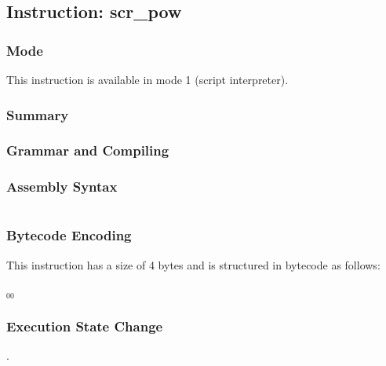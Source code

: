\subsection{Instruction: scr\_pow}

\subsubsection{Mode}
This instruction is available in mode 1 (script interpreter).
\subsubsection{Summary}


\subsubsection{Grammar and Compiling}


\subsubsection{Assembly Syntax}

\begin{myquote}
\begin{verbatim}

\end{verbatim}
\end{myquote}

\subsubsection{Bytecode Encoding}

This instruction has a size of 4 bytes and is structured in bytecode as follows:

$_{00}$\ 


\subsubsection{Execution State Change}

.



